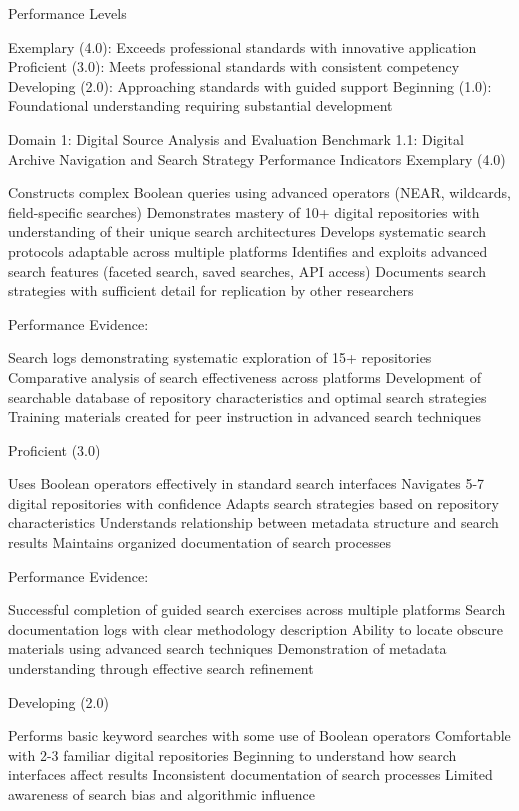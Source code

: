 \begin{appendices}
Performance Levels

Exemplary (4.0): Exceeds professional standards with innovative application
Proficient (3.0): Meets professional standards with consistent competency
Developing (2.0): Approaching standards with guided support
Beginning (1.0): Foundational understanding requiring substantial development


Domain 1: Digital Source Analysis and Evaluation
Benchmark 1.1: Digital Archive Navigation and Search Strategy
Performance Indicators
Exemplary (4.0)

Constructs complex Boolean queries using advanced operators (NEAR, wildcards, field-specific searches)
Demonstrates mastery of 10+ digital repositories with understanding of their unique search architectures
Develops systematic search protocols adaptable across multiple platforms
Identifies and exploits advanced search features (faceted search, saved searches, API access)
Documents search strategies with sufficient detail for replication by other researchers

Performance Evidence:

Search logs demonstrating systematic exploration of 15+ repositories
Comparative analysis of search effectiveness across platforms
Development of searchable database of repository characteristics and optimal search strategies
Training materials created for peer instruction in advanced search techniques

Proficient (3.0)

Uses Boolean operators effectively in standard search interfaces
Navigates 5-7 digital repositories with confidence
Adapts search strategies based on repository characteristics
Understands relationship between metadata structure and search results
Maintains organized documentation of search processes

Performance Evidence:

Successful completion of guided search exercises across multiple platforms
Search documentation logs with clear methodology description
Ability to locate obscure materials using advanced search techniques
Demonstration of metadata understanding through effective search refinement

Developing (2.0)

Performs basic keyword searches with some use of Boolean operators
Comfortable with 2-3 familiar digital repositories
Beginning to understand how search interfaces affect results
Inconsistent documentation of search processes
Limited awareness of search bias and algorithmic influence


\end{appendices}
